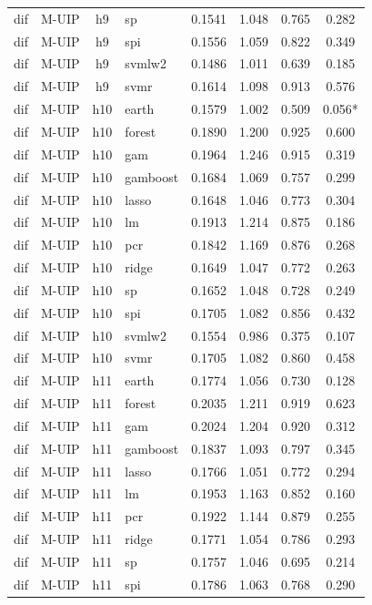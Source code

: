 \begin{ThreePartTable}
\begin{longtable}[t]{llclcccc}
dif & M-UIP & h9 & sp & 0.1541 & 1.048 & 0.765 & 0.282\\
dif & M-UIP & h9 & spi & 0.1556 & 1.059 & 0.822 & 0.349\\
dif & M-UIP & h9 & svmlw2 & 0.1486 & 1.011 & 0.639 & 0.185\\
dif & M-UIP & h9 & svmr & 0.1614 & 1.098 & 0.913 & 0.576\\
\addlinespace
dif & M-UIP & h10 & earth & 0.1579 & 1.002 & 0.509 & 0.056*\\
dif & M-UIP & h10 & forest & 0.1890 & 1.200 & 0.925 & 0.600\\
dif & M-UIP & h10 & gam & 0.1964 & 1.246 & 0.915 & 0.319\\
dif & M-UIP & h10 & gamboost & 0.1684 & 1.069 & 0.757 & 0.299\\
dif & M-UIP & h10 & lasso & 0.1648 & 1.046 & 0.773 & 0.304\\
dif & M-UIP & h10 & lm & 0.1913 & 1.214 & 0.875 & 0.186\\
dif & M-UIP & h10 & pcr & 0.1842 & 1.169 & 0.876 & 0.268\\
dif & M-UIP & h10 & ridge & 0.1649 & 1.047 & 0.772 & 0.263\\
dif & M-UIP & h10 & sp & 0.1652 & 1.048 & 0.728 & 0.249\\
dif & M-UIP & h10 & spi & 0.1705 & 1.082 & 0.856 & 0.432\\
dif & M-UIP & h10 & svmlw2 & 0.1554 & 0.986 & 0.375 & 0.107\\
dif & M-UIP & h10 & svmr & 0.1705 & 1.082 & 0.860 & 0.458\\
\addlinespace
dif & M-UIP & h11 & earth & 0.1774 & 1.056 & 0.730 & 0.128\\
dif & M-UIP & h11 & forest & 0.2035 & 1.211 & 0.919 & 0.623\\
dif & M-UIP & h11 & gam & 0.2024 & 1.204 & 0.920 & 0.312\\
dif & M-UIP & h11 & gamboost & 0.1837 & 1.093 & 0.797 & 0.345\\
dif & M-UIP & h11 & lasso & 0.1766 & 1.051 & 0.772 & 0.294\\
dif & M-UIP & h11 & lm & 0.1953 & 1.163 & 0.852 & 0.160\\
dif & M-UIP & h11 & pcr & 0.1922 & 1.144 & 0.879 & 0.255\\
dif & M-UIP & h11 & ridge & 0.1771 & 1.054 & 0.786 & 0.293\\
dif & M-UIP & h11 & sp & 0.1757 & 1.046 & 0.695 & 0.214\\
dif & M-UIP & h11 & spi & 0.1786 & 1.063 & 0.768 & 0.290\\

\end{longtable}
\end{ThreePartTable}

